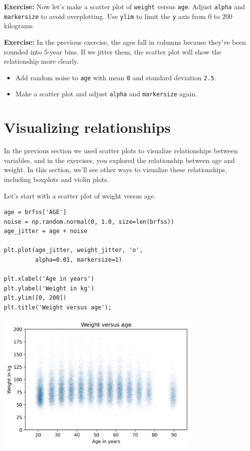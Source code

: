 \textbf{Exercise:} Now let's make a scatter plot of
\passthrough{\lstinline!weight!} versus \passthrough{\lstinline!age!}.
Adjust \passthrough{\lstinline!alpha!} and
\passthrough{\lstinline!markersize!} to avoid overplotting. Use
\passthrough{\lstinline!ylim!} to limit the \passthrough{\lstinline!y!}
axis from 0 to 200 kilograms.

\textbf{Exercise:} In the previous exercise, the ages fall in columns
because they've been rounded into 5-year bins. If we jitter them, the
scatter plot will show the relationship more clearly.

\begin{itemize}

\item
  Add random noise to \passthrough{\lstinline!age!} with mean
  \passthrough{\lstinline!0!} and standard deviation
  \passthrough{\lstinline!2.5!}.
\item
  Make a scatter plot and adjust \passthrough{\lstinline!alpha!} and
  \passthrough{\lstinline!markersize!} again.
\end{itemize}

\hypertarget{visualizing-relationships}{%
\section{Visualizing relationships}\label{visualizing-relationships}}

In the previous section we used scatter plots to visualize relationships
between variables, and in the exercises, you explored the relationship
between age and weight. In this section, we'll see other ways to
visualize these relationships, including boxplots and violin plots.

Let's start with a scatter plot of weight versus age.

\begin{lstlisting}[]
age = brfss['AGE']
noise = np.random.normal(0, 1.0, size=len(brfss))
age_jitter = age + noise

plt.plot(age_jitter, weight_jitter, 'o', 
         alpha=0.01, markersize=1)

plt.xlabel('Age in years')
plt.ylabel('Weight in kg')
plt.ylim([0, 200])
plt.title('Weight versus age');
\end{lstlisting}

\begin{center}
\includegraphics[width=4in]{chapters/09_relationships_files/09_relationships_38_0.png}
\end{center}


